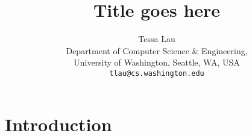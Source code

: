 \documentclass{article}
\begin{document}
\title {Title goes here}
\author {Tessa Lau \\
Department of Computer Science \& Engineering, \\
University of Washington, Seattle, WA, USA \\
{\tt tlau@cs.washington.edu}
}
\maketitle

\begin{abstract}
\end{abstract}

\section{Introduction}



\end{document}
